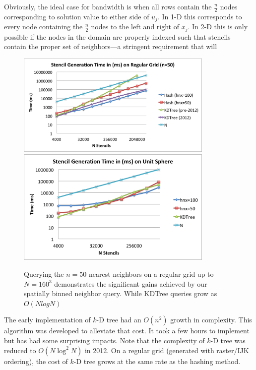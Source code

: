 \documentclass{report}
\begin{document}


Obviously, the ideal case for bandwidth is when all rows contain the $\frac{n}{2}$ nodes corresponding to solution value to either side of $u_j$. In 1-D this corresponds to every node containing the $\frac{n}{2}$ nodes to the left and right of $x_j$. In 2-D this is only possible if the nodes in the domain are properly indexed such that stencils contain the proper set of neighbors---a stringent requirement that will 


\begin{figure}
\centering
\includegraphics[width=9.5cm]{../figures/stencils/kdtree_old_reg_subsets_4m_stencil_gen_time.png}
\includegraphics[width=9.5cm]{../figures/stencils/sphere_subsets_1m_stencil_gen_time.png}
\caption{Querying the $n=50$ nearest neighbors on a regular grid up to $N=160^3$ demonstrates the significant gains achieved by our spatially binned neighbor query. While KDTree queries grow as $O(N log N)$}
\label{fig:hash_results}
\end{figure}


The early implementation of $k$-D tree had an $O(n^2)$ growth in complexity. This algorithm was developed to alleviate that cost. It took a few hours to implement but has had some surprising impacts. Note that the complexity of $k$-D tree was reduced to $O(N \log^2 N)$ in 2012. On a regular grid (generated with raster/IJK ordering), the cost of $k$-D tree grows at the same rate as the hashing method. 
\end{document}
